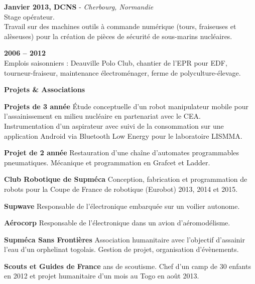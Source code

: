 \documentclass[a4paper,11pt,final]{memoir}
\newcommand{\Sep}{\vspace{1.5em}}
\newcommand{\SmallSep}{\vspace{0.5em}}
\newcommand{\CVSection}[1]
	{\Large\textbf{#1}\par
	\SmallSep\normalsize\normalfont}
\newcommand{\CVItem}[2]
	{\textbf{\color{RoyalBlue} #1 \color{dark_gray} #2}\normalsize\normalfont}
\newcommand{\city}[1]
	{{\small\color{dark_gray}\emph{#1}}\normalsize\normalfont}
\begin{document}
\CVItem{Janvier 2013,}{DCNS} - \city{Cherbourg, Normandie}\\
Stage opérateur.\\
Travail sur des machines outils à commande numérique (tours, fraiseuses et alèseuses) pour la création de pièces de sécurité de sous-marins nucléaires.
\SmallSep

\CVItem{2006 -- 2012}{}\\
Emplois saisonniers : Deauville Polo Club, chantier de l'EPR pour EDF, tourneur-fraiseur, maintenance électroménager, ferme de polyculture-élevage.
\Sep

\CVSection{Projets \& Associations}
\CVItem{Projets de 3\ieme{} année}{}Étude conceptuelle d'un robot manipulateur mobile pour l'assainissement en milieu nucléaire en partenariat avec le CEA.\\
Instrumentation d'un aspirateur avec suivi de la consommation sur une application Android via Bluetooth Low Energy pour le laboratoire LISMMA.
\SmallSep

\CVItem{Projet de 2\ieme{} année}{}Restauration d'une chaîne d'automates programmables pneumatiques. Mécanique et programmation en Grafcet et Ladder.
\SmallSep

\CVItem{Club Robotique de Supméca}{}Conception, fabrication et programmation de robots pour la Coupe de France de robotique (Eurobot) 2013, 2014 et 2015.
\SmallSep

\CVItem{Supwave}{}Responsable de l'électronique embarquée sur un voilier autonome.
\SmallSep

\CVItem{Aérocorp}{}Responsable de l'électronique dans un avion d'aéromodélisme.
\SmallSep

\CVItem{Supméca Sans Frontières}{}Association humanitaire avec l'objectif d'assainir l'eau d'un orphelinat togolais. Gestion de projet, organisation d'évènements.
\SmallSep

\CVItem{Scouts et Guides de France}{}8 ans de scoutisme. Chef d'un camp de 30 enfants en 2012 et projet humanitaire d'un mois au Togo en août 2013.

\end{document}
